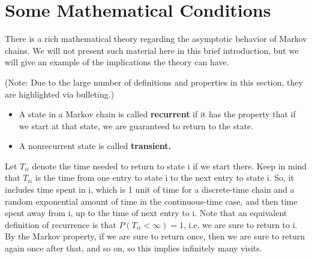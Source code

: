 % 
% 
% 
% 
% 
% 
% 
% 
% 
% 
% 

\section{Some Mathematical Conditions}

There is a rich mathematical theory regarding the asymptotic behavior of
Markov chains. We will not present such material here in this brief
introduction, but we will give an example of the implications the theory
can have.  

(Note:  Due to the large number of definitions and properties in this
section, they are highlighted via bulleting.)

\begin{itemize}

\item A state in a Markov chain is called \textbf{recurrent} if it has
the property that if we start at that state, we are guaranteed to return
to the state.

\item A nonrecurrent state is called \textbf{transient.} 
\end{itemize}

Let $T_{ii}$ denote the time needed to return to state i if we start
there.  Keep in mind that $T_{ii}$ is the time from one entry to state i
to the next entry to state i.  So, it includes time spent in i, which is
1 unit of time for a discrete-time chain and a random exponential amount
of time in the continuous-time case, and then time spent away from i, up
to the time of next entry to i.  Note that an equivalent definition of
recurrence is that $P(T_{ii}<\infty )=1$, i.e.  we are sure to return to
i.  By the Markov property, if we are sure to return once, then we are
sure to return again once after that, and so on, so this implies
infinitely many visits.

